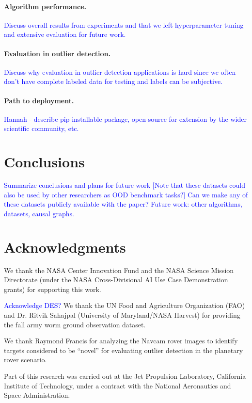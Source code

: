 \documentclass[letterpaper]{article} %
\newcommand{\todo}[1]{\textcolor{blue}{#1}}
\begin{document}
\paragraph{Algorithm performance.} \todo{Discuss overall results from
 experiments and that we left hyperparameter tuning and extensive
 evaluation for future work.}
 
\paragraph{Evaluation in outlier detection.} \todo{Discuss why evaluation
in outlier detection applications is hard since we often don't have complete
labeled data for testing and labels can be subjective.}

\paragraph{Path to deployment.} \todo{Hannah - describe pip-installable
package, open-source for extension by the wider scientific community, etc.}

\section{Conclusions}
\todo{
Summarize conclusions and plans for future work
[Note that these datasets could also be used by other researchers as OOD
 benchmark tasks?]
 \todo{Can we make any of these datasets publicly available with the paper?}
 \todo{Future work: other algorithms, datasets, causal graphs.}
}




\section{Acknowledgments}
We thank the NASA Center Innovation Fund and the NASA Science Mission 
Directorate (under the NASA Cross-Divisional AI Use Case Demonstration grants)
 for supporting this work.

\todo{Acknowledge DES?}
We thank the UN Food and Agriculture Organization (FAO) and Dr. Ritvik Sahajpal
(University of Maryland/NASA Harvest) for providing the fall army worm ground
 observation dataset.

We thank Raymond Francis for analyzing the Navcam rover images to
identify targets considered to be ``novel'' for evaluating outlier
detection in the planetary rover scenario.

Part of this research was carried out at the Jet Propulsion
Laboratory, California Institute of Technology, under a contract with
the National Aeronautics and Space Administration.
\end{document}
